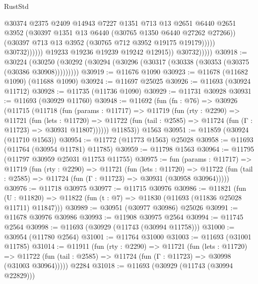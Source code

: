 \begin{lexlean}{RustStd}
\begin{coremodule}
                                    @30374
                                    @2375
                                    @2409
                                    @14943
                                    @7227
                                    @1351
                                    @713
                                    @13
                                    @2651
                                    @6440
                                    @2651
                                    @3952
                                    (@30397 @1351 @13 @6440 (@30765 @1350 @6440 @27262 @27266))
                                    (@30397 @713 @13 @3952 (@30765 @712 @3952 @19175 @19179)))))
                              @30732))))))
                  @19233
                  @19236
                  @19239
                  @19242
                  @12915))
              @30732)))))
@30918 := @30224
    (@30250 (@30292 (@30294 (@30296 (@30317 (@30338 (@30353 (@30375 (@30386 @30908)))))))))
@30919 := @11676 @1090
@30923 := @11678 (@11682 @1090) (@11688 @1090)
@30924 := @11697 @25025
@30926 := @11693 (@30924 @11712)
@30928 := @11735 (@11736 @1090)
@30929 := @11731 @30928
@30931 := @11693 (@30929 @11760)
@30948 := @11692
    (fun (fn : @76) =>
    @30926
      (@11715
        (@11718
          (fun (params : @11717) =>
          @11719
            (fun (rty : @2290) =>
            @11721
              (fun (lets : @11720) =>
              @11722 (fun (tail : @2585) => @11724 (fun (Γ : @11723) => @30931 @11807))))))
        @11853))
    @1563
@30951 := @11859 (@30924 (@11710 @1563))
@30954 := @11772 (@11773 @1563) @25028
@30958 := @11693 (@11764 (@30954 @11781) @11785)
@30959 := @11798 @1563
@30964 := @11795 (@11797 @30959 @25031 @11753 @11755)
@30975 := fun (params : @11717) =>
  @11719
    (fun (rty : @2290) =>
    @11721
      (fun (lets : @11720) =>
      @11722 (fun (tail : @2585) => @11724 (fun (Γ : @11723) => @30931 (@30958 @30964)))))
@30976 := @11718 @30975
@30977 := @11715 @30976
@30986 := @11821
    (fun (U : @11820) => @11822 (fun (t : @7) => @11830 (@11693 (@11836 @25028 @11711) @11847)))
@30989 := @30951 (@30977 @30986) @25026
@30991 := @11678 @30976 @30986
@30993 := @11908 @30975 @2564
@30994 := @11745 @2564
@30998 := @11693 (@30929 (@11743 (@30994 @11758)))
@31000 := @30954 (@11780 @2564)
@31001 := @11764 @31000
@31003 := @11693 (@31001 @11785)
@31014 := @11911
    (fun (rty : @2290) =>
    @11721
      (fun (lets : @11720) =>
      @11722 (fun (tail : @2585) => @11724 (fun (Γ : @11723) => @30998 (@31003 @30964)))))
    @2284
@31018 := @11693 (@30929 (@11743 (@30994 @22829)))

\end{coremodule}
\end{lexlean}
